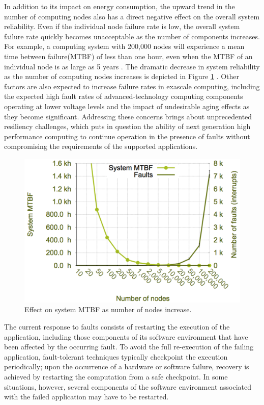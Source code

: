 In addition to its impact on energy consumption, the upward trend in
the number of computing nodes also has a direct negative effect on the
overall system reliability. Even if the individual node failure rate
is low, the overall system failure rate quickly becomes unacceptable
as the number of components increases. For example, a computing system
with 200,000 nodes will experience a mean time between failure(MTBF)
of less than one hour, even when the MTBF of an individual node is as
large as 5 years \cite{riesen_sandia_2010}. The dramatic decrease in
system reliability as the number of computing nodes increases is
depicted in Figure \ref{sandia_system_mtbf}
\cite{riesen_sandia_2010}. Other factors are also expected to increase
failure rates in exascale computing, including the expected high fault rates of
advanced-technology computing components operating at lower voltage
levels and the impact of undesirable aging effects as they become
significant\cite{srinivasan_dsn_2004}. Addressing these concerns
brings about unprecedented resiliency challenges, which puts in
question the ability of next generation high performance computing to
continue operation in the presence of faults without compromising the
requirements of the supported applications.

\begin{figure}[!t]
\centering
\includegraphics[width=\columnwidth]{figures/sandia_system_failure_rate_increase_nodes.pdf}
\caption { Effect on system MTBF as number of nodes increase. }
\label{sandia_system_mtbf}
\end{figure}

The current response to faults consists of restarting the execution of
the application, including those components of its software
environment that have been affected by the occurring fault. To avoid
the full re-execution of the failing application, fault-tolerant
techniques typically checkpoint the execution periodically; upon the
occurrence of a hardware or software failure, recovery is achieved by
restarting the computation from a safe checkpoint. In some situations,
however, several components of the software environment associated
with the failed application may have to be restarted.

